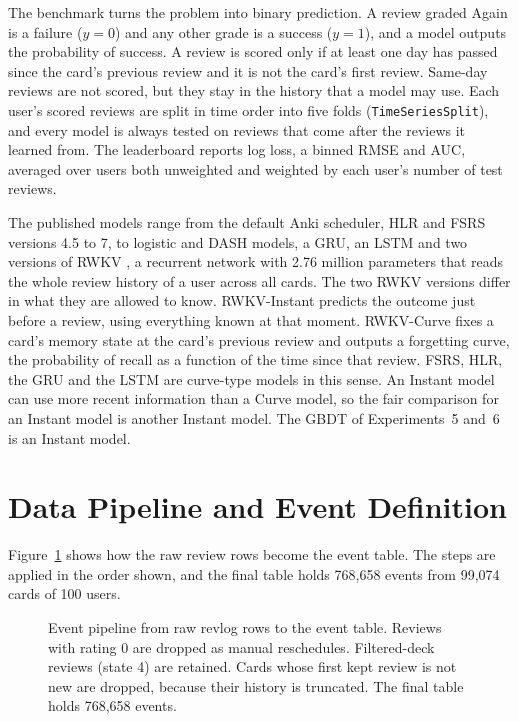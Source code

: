 The benchmark turns the problem into binary prediction. A review graded Again is a failure ($y=0$) and any other grade is a
success ($y=1$), and a model outputs the probability of success. A review is scored only if at least one day has passed
since the card's previous review and it is not the card's first review. Same-day reviews are not scored, but they stay in the
history that a model may use. Each user's scored reviews are split in time order into five folds
(\texttt{TimeSeriesSplit}), and every model is always tested on reviews that come after the reviews it learned from. The
leaderboard reports log loss, a binned RMSE and AUC, averaged over users both unweighted and weighted by each user's
number of test reviews.

The published models range from the default Anki scheduler, HLR and FSRS versions 4.5 to 7, to logistic and DASH models, a
GRU, an LSTM and two versions of RWKV \cite{peng2023rwkv}, a recurrent network with 2.76 million parameters that reads the
whole review history of a user across all cards. The two RWKV versions differ in what they are allowed to know. RWKV-Instant
predicts the outcome just before a review, using everything known at that moment. RWKV-Curve fixes a card's memory state at
the card's previous review and outputs a forgetting curve, the probability of recall as a function of the time since that
review. FSRS, HLR, the GRU and the LSTM are curve-type models in this sense. An Instant model can use more recent
information than a Curve model, so the fair comparison for an Instant model is another Instant model. The GBDT of
Experiments~5 and~6 is an Instant model.

\section{Data Pipeline and Event Definition}
\label{sec:design-pipeline}

Figure~\ref{fig:tk_event_pipeline} shows how the raw review rows become the event table. The steps are applied in the
order shown, and the final table holds 768,658 events from 99,074 cards of 100 users.

\begin{figure}[htbp]
  \centering
  
  \caption{Event pipeline from raw revlog rows to the event table. Reviews with rating 0 are dropped as manual
    reschedules. Filtered-deck reviews (state 4) are retained. Cards whose first kept review is not new are dropped,
    because their history is truncated. The final table holds 768,658 events.}
  \label{fig:tk_event_pipeline}
\end{figure}

